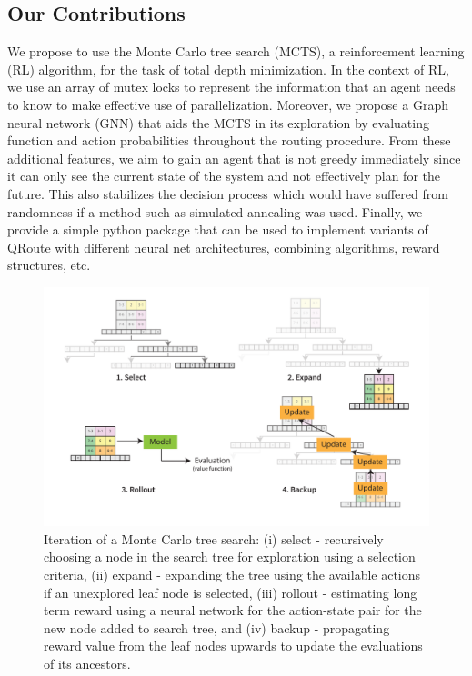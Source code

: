 \documentclass[%
 reprint,
amsmath,amssymb,showkeys,
pra,
]{revtex4-2}
\begin{document}
\subsection{\label{sec:intro-contribution}Our Contributions}

We propose to use the Monte Carlo tree search (MCTS), a reinforcement learning (RL) algorithm, for the task of total depth minimization. In the context of RL, we use an array of mutex locks to represent the information that an agent needs to know to make effective use of parallelization. Moreover, we propose a Graph neural network (GNN) that aids the MCTS in its exploration by evaluating function and action probabilities throughout the routing procedure. From these additional features, we aim to gain an agent that is not greedy immediately since it can only see the current state of the system and not effectively plan for the future. This also stabilizes the decision process which would have suffered from randomness if a method such as simulated annealing was used. Finally, we provide a simple python package that can be used to implement variants of QRoute with different neural net architectures, combining algorithms, reward structures, etc. \citep{codebase}

\begin{figure}[ht]
    \includegraphics[width=0.96\linewidth]{images/Search.pdf}
    \caption{\label{fig:mcts-explainer}
        Iteration of a Monte Carlo tree search: (i) select - recursively choosing a node in the search tree for exploration using a selection criteria, (ii) expand - expanding the tree using the available actions if an unexplored leaf node is selected, (iii) rollout - estimating long term reward using a neural network for the action-state pair for the new node added to search tree, and (iv) backup - propagating reward value from the leaf nodes upwards to update the evaluations of its ancestors.}
\end{figure}
\end{document}

